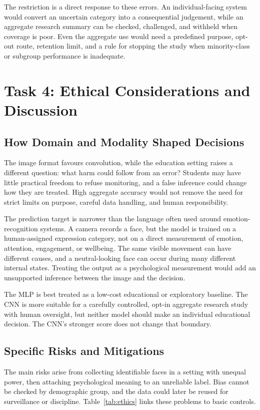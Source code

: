 \documentclass[10pt,twocolumn]{article}
\newcommand{\task}[1]{\section{Task #1}}
\begin{document}
The restriction is a direct response to these errors. An individual-facing system would convert an uncertain category into a consequential judgement, while an aggregate research summary can be checked, challenged, and withheld when coverage is poor. Even the aggregate use would need a predefined purpose, opt-out route, retention limit, and a rule for stopping the study when minority-class or subgroup performance is inadequate.


\task{4: Ethical Considerations and Discussion}

\subsection{How Domain and Modality Shaped Decisions}

The image format favours convolution, while the education setting raises a different question: what harm could follow from an error? Students may have little practical freedom to refuse monitoring, and a false inference could change how they are treated. High aggregate accuracy would not remove the need for strict limits on purpose, careful data handling, and human responsibility.

The prediction target is narrower than the language often used around emotion-recognition systems. A camera records a face, but the model is trained on a human-assigned expression category, not on a direct measurement of emotion, attention, engagement, or wellbeing. The same visible movement can have different causes, and a neutral-looking face can occur during many different internal states. Treating the output as a psychological measurement would add an unsupported inference between the image and the decision.

The MLP is best treated as a low-cost educational or exploratory baseline. The CNN is more suitable for a carefully controlled, opt-in aggregate research study with human oversight, but neither model should make an individual educational decision. The CNN's stronger score does not change that boundary.

\subsection{Specific Risks and Mitigations}

The main risks arise from collecting identifiable faces in a setting with unequal power, then attaching psychological meaning to an unreliable label. Bias cannot be checked by demographic group, and the data could later be reused for surveillance or discipline. Table~\ref{tab:ethics} links these problems to basic controls.
\end{document}
